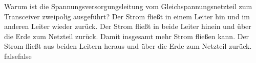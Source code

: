     {Warum ist die Spannungsversorgungsleitung vom Gleichspannungsnetzteil zum Transceiver zweipolig ausgeführt?}
    {Der Strom fließt in einem Leiter hin und im anderen Leiter wieder zurück.}
    {Der Strom fließt in beide Leiter hinein und über die Erde zum Netzteil zurück.}
    {Damit insgesamt mehr Strom fließen kann.}
    {Der Strom fließt aus beiden Leitern heraus und über die Erde zum Netzteil zurück.}
    {false}{false}